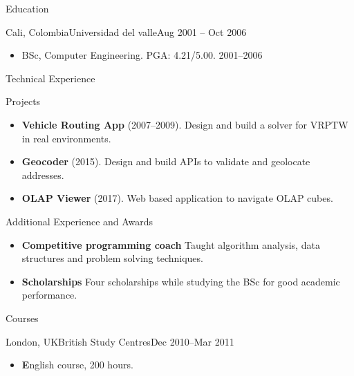 \documentclass[]{mcdowellcv}
\begin{document}
	\begin{cvsection}{Education}
		\begin{cvsubsection}{Cali, Colombia}{Universidad del valle}{Aug 2001 -- Oct 2006}
			\begin{itemize}
				\item BSc,	Computer	Engineering. PGA: 4.21/5.00. 2001--2006
			\end{itemize}
		\end{cvsubsection}
	\end{cvsection}
	
	\begin{cvsection}{Technical Experience}
		\begin{cvsubsection}{Projects}{}{}
			\begin{itemize}
				\item \textbf{Vehicle Routing App} (2007--2009). Design and build a solver for VRPTW in real environments.
				\item \textbf{Geocoder} (2015). Design and build APIs to validate and geolocate addresses. 
				\item \textbf{OLAP Viewer} (2017).  Web based application to navigate OLAP cubes.
			\end{itemize}
		\end{cvsubsection}
	\end{cvsection}
	
	\begin{cvsection}{Additional Experience and Awards}
		\begin{cvsubsection}{}{}{}	
			\begin{itemize}
				\item \textbf{Competitive programming coach} Taught algorithm analysis, data structures and problem solving techniques.
				\item \textbf{Scholarships} Four scholarships while studying the BSc for good academic performance.
			\end{itemize}
		\end{cvsubsection}
	\end{cvsection}

	\begin{cvsection}{Courses}
		\begin{cvsubsection}{London,	UK}{British Study Centres}{Dec 2010--Mar 2011}	
			\begin{itemize}
				\item \textbf English course, 200 hours. 
			\end{itemize}
		\end{cvsubsection}
	\end{cvsection}	
		
\end{document}

